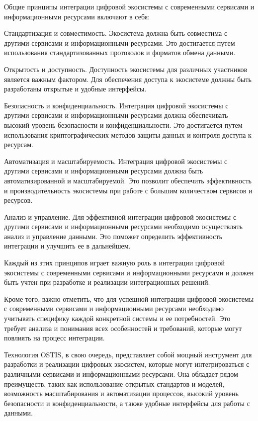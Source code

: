 Общие принципы интеграции цифровой экосистемы с современными сервисами и информационными ресурсами включают в себя:
\begin{textitemize}
    \item Стандартизация и совместимость. Экосистема должна быть совместима с другими сервисами и информационными ресурсами. Это достигается путем использования стандартизованных протоколов и форматов обмена данными.
    \item Открытость и доступность. Доступность экосистемы для различных участников является важным фактором. Для обеспечения доступа к экосистеме должны быть разработаны открытые и удобные интерфейсы.
    \item Безопасность и конфиденциальность. Интеграция цифровой экосистемы с другими сервисами и информационными ресурсами должна обеспечивать высокий уровень безопасности и конфиденциальности. Это достигается путем использования криптографических методов защиты данных и контроля доступа к ресурсам.
    \item Автоматизация и масштабируемость. Интеграция цифровой экосистемы с другими сервисами и информационными ресурсами должна быть автоматизированной и масштабируемой. Это позволит обеспечить эффективность и производительность экосистемы при работе с большим количеством сервисов и ресурсов.
    \item Анализ и управление. Для эффективной интеграции цифровой экосистемы с другими сервисами и информационными ресурсами необходимо осуществлять анализ и управление данными. Это поможет определить эффективность интеграции и улучшить ее в дальнейшем.
\end{textitemize}

Каждый из этих принципов играет важную роль в интеграции цифровой экосистемы с современными сервисами и информационными ресурсами и должен быть учтен при разработке и реализации интеграционных решений.

Кроме того, важно отметить, что для успешной интеграции цифровой экосистемы с современными сервисами и информационными ресурсами необходимо учитывать специфику каждой конкретной системы и ее потребностей. Это требует анализа и понимания всех особенностей и требований, которые могут повлиять на процесс интеграции.

Технология OSTIS, в свою очередь, представляет собой мощный инструмент для разработки и реализации цифровых экосистем, которые могут интегрироваться с различными сервисами и информационными ресурсами. Она обладает рядом преимуществ, таких как использование открытых стандартов и моделей, возможность масштабирования и автоматизации процессов, высокий уровень безопасности и конфиденциальности, а также удобные интерфейсы для работы с данными.

